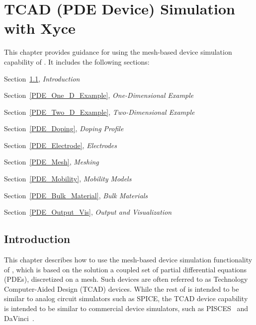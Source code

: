 


\chapter{TCAD (PDE Device) Simulation with Xyce}
\label{PDE_Devices}

{
This chapter provides guidance for using the mesh-based device simulation
capability of \Xyce{}.  It includes the following sections:
\begin{XyceItemize}
\item Section~\ref{PDE_Introduction}, {\em Introduction}
\item Section~\ref{PDE_One_D_Example}, {\em One-Dimensional Example}
\item Section~\ref{PDE_Two_D_Example}, {\em Two-Dimensional Example}
\item Section~\ref{PDE_Doping}, {\em Doping Profile}
\item Section~\ref{PDE_Electrode}, {\em Electrodes}
\item Section~\ref{PDE_Mesh}, {\em Meshing}
\item Section~\ref{PDE_Mobility}, {\em Mobility Models}
\item Section~\ref{PDE_Bulk_Material}, {\em Bulk Materials}
\item Section~\ref{PDE_Output_Vis}, {\em Output and Visualization}
\end{XyceItemize}
}

\section{Introduction} \label{PDE_Introduction}
This chapter describes how to use the mesh-based device simulation 
functionality of \Xyce{}, which is based on the solution a coupled set of partial 
differential equations (PDEs), discretized on a mesh.
Such devices are often referred to as Technology Computer-Aided Design (TCAD) devices.
While the rest of \Xyce{} is intended to be similar to analog circuit
simulators such as SPICE, the TCAD device capability is intended to 
be similar to commercial device simulators, such as PISCES~\cite{Yu} and
DaVinci~\cite{DaVinci}.

